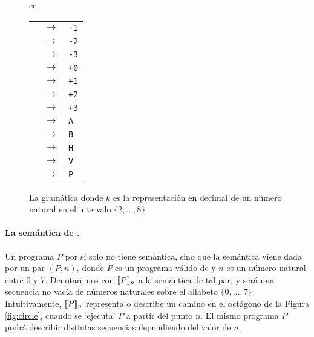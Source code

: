 \begin{figure}
\begin{center}
\begin{tabular}{cc}
\begin{minipage}[t]{0.35\textwidth}
    \begin{tabular}{rcl}
    \atom  & $\to$ & \verb#-1# %
    \\
    \atom  & $\to$ & \verb#-2# %
    \\
    \atom  & $\to$ & \verb#-3# %
    \\
    \atom  & $\to$ & \verb#+0# %
    \\
    \atom  & $\to$ & \verb#+1# %
    \\
    \atom  & $\to$ & \verb#+2# %
    \\
    \atom  & $\to$ & \verb#+3# %
    \\
    \atom  & $\to$ & \verb#A # %
    \\
    \atom  & $\to$ & \verb#B # %
    \\
    \atom  & $\to$ & \verb#H # %
    \\
    \atom  & $\to$ & \verb#V # %
    \\
    \atom  & $\to$ & \verb#P # %
    \end{tabular}
    \end{minipage}
\end{tabular}
\end{center}
\caption{La gramática \gramgeo donde $k$ es la representación en decimal de un número natural en el intervalo $\{2,\dots,8\}$}
\label{fig:gramgeo}
\end{figure}


\paragraph{La semántica de \gramgeo.}
Un programa $P$ por sí solo no tiene semántica, sino que la semántica viene dada por un par $(P,n)$, donde $P$ es un programa válido de \gramgeo y $n$ es un número natural entre 0 y 7. Denotaremos con $\llbracket P\rrbracket_n$ a la semántica de tal par, y será una secuencia no vacía de números naturales sobre el alfabeto $\{0,\dots,7\}$. Intuitivamente, $\llbracket P\rrbracket_n$ representa o describe un camino en el octágono de la Figura \ref{fig:circle}, cuando se `ejecuta' $P$ a partir del punto $n$. El mismo programa $P$ podrá describir distintas secuencias dependiendo del valor de $n$. 

